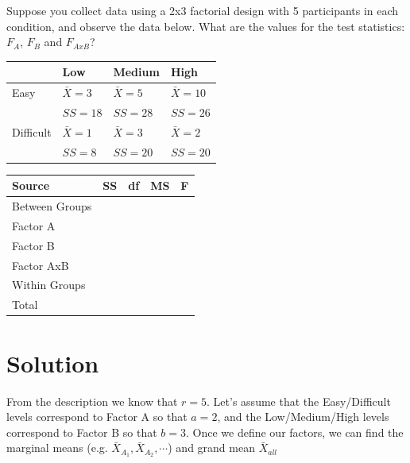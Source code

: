 \documentclass{tufte-handout}
\begin{document}
Suppose you collect data using a 2x3 factorial design with 5 participants in each condition, and observe the data below. What are the values for the test statistics: $F_A$, $F_B$ and $F_{AxB}$?

\begin{table}
  \centering
  \selectfont
  \begin{tabular}{llll}
    \toprule
    & Low & Medium & High\\
    \midrule
    Easy & $\bar{X}=3$ & $\bar{X}=5$ & $\bar{X}=10$\\
    & $SS=18$ & $SS=28$ & $SS=26$\\	
    Difficult & $\bar{X}=1$ & $\bar{X}=3$ & $\bar{X}=2$\\
    & $SS=8$ & $SS=20$ & $SS=20$\\	
    \bottomrule
  \end{tabular}
  \label{tab:normaltab}
\end{table}

\vspace{4.5 in}

\begin{table}
  \centering
  \selectfont
  \begin{tabular}{lllll}
    \toprule
    Source & \qquad SS & \qquad df & \qquad MS & \qquad F \\
    \midrule
    Between Groups & & & & \\
    \qquad Factor A & & & & \\
    \qquad Factor B & & & & \\
    \qquad Factor AxB & & & & \\
    Within Groups & & & & \\
    Total & & & & \\
    \bottomrule
  \end{tabular}
  \label{tab:normaltab}
\end{table}


\section{Solution}

\begin{fullwidth}
From the description we know that $r=5$. Let's assume that the Easy/Difficult levels correspond to Factor A so that $a=2$, and the Low/Medium/High levels correspond to Factor B so that $b=3$. Once we define our factors, we can find the marginal means (e.g. $\bar{X}_{A_1}, \bar{X}_{A_2}, \cdots$) and grand mean $\bar{X}_{all}$
\end{fullwidth}
\end{document}
